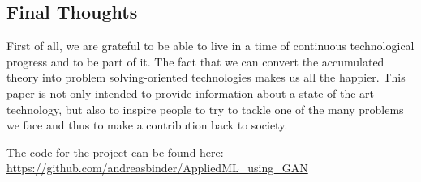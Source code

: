 	\subsection{Final Thoughts}
	First of all, we are grateful to be able to live in a time of continuous technological progress and to be part of it. The fact that we can convert the accumulated theory into problem solving-oriented technologies makes us all the happier. This paper is not only intended to provide information about a state of the art technology, but also to inspire people to try to tackle one of the many problems we face and thus to make a contribution back to society. 
	
	\appendix
    The code for the project can be found here:\\
    \url{https://github.com/andreasbinder/AppliedML\_using\_GAN} 